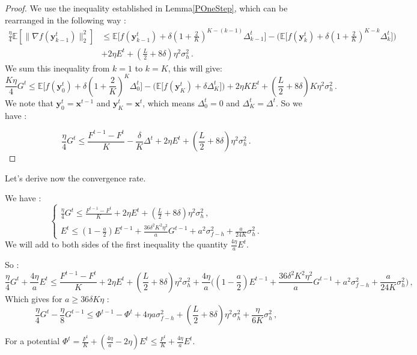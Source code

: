 \documentclass[10pt]{article} %
\theoremstyle{plain}
\theoremstyle{definition}
\theoremstyle{remark}
\newcommand{\norm}[1]{\|#1\|_2}
\def\vx{{\bm{x}}}
\def\vy{{\bm{y}}}
\newcommand{\E}{\mathbb{E}}
\begin{document}
\begin{proof} We use the inequality established in Lemma\ref{POneStep}, which can be rearranged in the following way :
\begin{align*}
    \frac{\eta}{4}\E[\norm{\nabla f(\vy^t_{k-1})}^2] &\leq \E\big[f(\vy^t_{k-1}) + \delta (1 + \frac{2}{K})^{K-(k-1)}\Delta^t_{k-1}\big] - \Big(\E\big[f(\vy^t_k) + \delta (1 + \frac{2}{K})^{K-k}\Delta^t_k\big]\Big) \\&+ 2 \eta E^t+(\frac{L}{2}+ 8\delta)\eta^2\sigma_h^2\, .
\end{align*}
We sum this inequality from $k=1$ to $k=K$, this will give:
$$\frac{K\eta}{4}G^t \leq \E\big[f(\vy^t_{0}) + \delta (1 + \frac{2}{K})^{K}\Delta^t_{0}\big] - \Big(\E\big[f(\vy^t_K) + \delta \Delta^t_K\big]\Big) + 2 \eta K E^t+(\frac{L}{2}+ 8\delta)K\eta^2\sigma_h^2\, .$$
We note that $\vy^t_{0} = \vx^{t-1}$ and $\vy^t_K = \vx^t$, which means $\Delta^t_{0} = 0$ and $\Delta^t_K = \Delta^t $.
So we have :

$$\frac{\eta}{4}G^t \leq  \frac{F^{t-1} - F^t}{K} - \frac{\delta}{K} \Delta^t + 2 \eta E^t + (\frac{L}{2}+ 8\delta)\eta^2\sigma_h^2\, .$$
\end{proof}

Let's derive now the convergence rate.

We have : $$\left\{
    \begin{array}{ll}
        \frac{\eta}{4}G^t \leq  \frac{F^{t-1} - F^t}{K} + 2 \eta E^t + (\frac{L}{2}+ 8\delta)\eta^2\sigma_h^2\, , \\
        E^t \leq (1 - \frac{a}{2})E^{t-1} + \frac{36\delta^2K^2\eta^2}{a}G^{t-1} + a^2 \sigma_{f-h}^2+ \frac{a}{24K}\sigma_h^2\, .
    \end{array}
\right.$$
 We will add to both sides of the first inequality the quantity $\frac{4\eta}{a}E^t$.
 
 So : $$\frac{\eta}{4}G^t + \frac{4\eta}{a}E^t\leq  \frac{F^{t-1} - F^t}{K} + 2 \eta E^t  + (\frac{L}{2}+ 8\delta)\eta^2\sigma_h^2 + \frac{4\eta}{a}\Big((1 - \frac{a}{2})E^{t-1} + \frac{36\delta^2K^2\eta^2}{a}G^{t-1} + a^2 \sigma_{f-h}^2+ \frac{a}{24K}\sigma_h^2\Big)\, ,$$
 Which gives for $a\geq 36 \delta K\eta$ :
 \begin{equation}\label{Mpotential}
     \frac{\eta}{4}G^t - \frac{\eta}{8}G^{t-1}\leq \Phi^{t-1} - \Phi^t + 4 \eta a \sigma_{f-h}^2 + (\frac{L}{2}+ 8\delta)\eta^2\sigma_h^2 + \frac{\eta}{6K}\sigma_h^2\, ,
 \end{equation}
 
For a potential $\Phi^t = \frac{F^t}{K} + (\frac{4\eta}{a} - 2\eta)E^t \leq \frac{F^t}{K} + \frac{4\eta}{a}E^t$.
\end{document}

